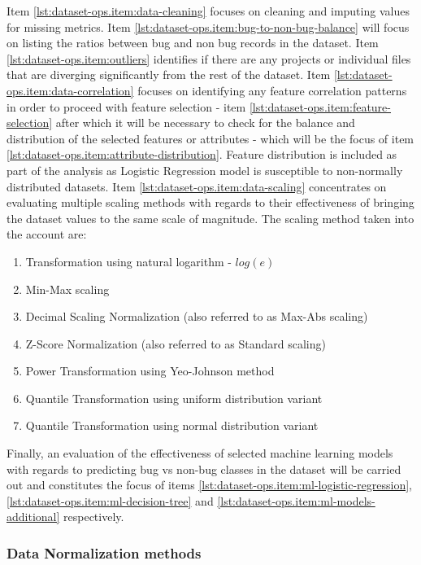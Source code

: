 Item \ref{lst:dataset-ops.item:data-cleaning} focuses on cleaning and imputing values for missing metrics. Item \ref{lst:dataset-ops.item:bug-to-non-bug-balance} will focus on listing the ratios between bug and non bug records in the dataset.
Item \ref{lst:dataset-ops.item:outliers} identifies if there are any projects or individual files that are diverging significantly from the rest of the dataset. 
Item \ref{lst:dataset-ops.item:data-correlation} focuses on identifying any feature correlation patterns in order to proceed with feature selection - item  \ref{lst:dataset-ops.item:feature-selection} after which it will be necessary to check for the balance and distribution of the selected features or attributes - which will be the focus of item \ref{lst:dataset-ops.item:attribute-distribution}. Feature distribution is included as part of the analysis as Logistic Regression model is susceptible to non-normally distributed datasets.
Item \ref{lst:dataset-ops.item:data-scaling} concentrates on evaluating multiple scaling methods with regards to their effectiveness of bringing the dataset values to the same scale of magnitude. The scaling method taken into the account are:
\begin{enumerate}
    \item Transformation using natural logarithm - $log(e)$ 
    \item Min-Max scaling
    \item Decimal Scaling Normalization (also referred to as Max-Abs scaling)
    \item Z-Score Normalization (also referred to as Standard scaling)
    \item Power Transformation using Yeo-Johnson method
    \item Quantile Transformation using uniform distribution variant
    \item Quantile Transformation using normal distribution variant
\end{enumerate}

Finally, an evaluation of the effectiveness of selected machine learning models with regards to predicting bug vs non-bug classes in the dataset will be carried out and constitutes the focus of items \ref{lst:dataset-ops.item:ml-logistic-regression}, \ref{lst:dataset-ops.item:ml-decision-tree} and \ref{lst:dataset-ops.item:ml-models-additional} respectively.
\subsubsection{Data Normalization methods}\label{sec:data-modelling:scalers}
